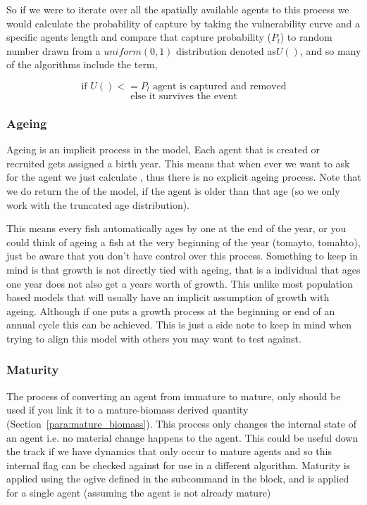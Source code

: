 So if we were to iterate over all the spatially available agents to this process we would calculate the probability of capture by taking the vulnerability curve and a specific agents length and compare that capture probability ($P_l$) to random number drawn from a $uniform(0,1)$ distribution denoted as$U()$, and so many of the algorithms include the term,

$$ \text{if }U() <= P_l \text{ agent is captured and removed}$$
$$ \text{else it survives the event}$$

\subsubsection{Ageing}

Ageing is an implicit process in the model, Each agent that is created or recruited gets assigned a birth year. This means that when ever we want to ask for the agent we just calculate , thus there is no explicit ageing process. Note that we do return the  of the model, if the agent is older than that age (so we only work with the truncated age distribution).


This means every fish automatically ages by one at the end of the year, or you could think of ageing a fish at the very beginning of the year (tomayto, tomahto), just be aware that you don't have control over this process. Something to keep in mind is that growth is not directly tied with ageing, that is a individual that ages one year does not also get a years worth of growth. This unlike most population based models that will usually have an implicit assumption of growth with ageing. Although if one puts a growth process at the beginning or end of an annual cycle this can be achieved. This is just a side note to keep in mind when trying to align this model with others you may want to test against.


\subsubsection{Maturity}\label{subsubsec:maturity}
The process of converting an agent from immature to mature, only should be used if you link it to a mature-biomass derived quantity (Section~\ref{para:mature_biomass}). This process only changes the internal state of an agent i.e. no material change happens to the agent. This could be useful down the track if we have dynamics that only occur to mature agents and so this internal flag can be checked against for use in a different algorithm. Maturity is applied using the ogive defined in the subcommand  in the  block, and is applied for a single agent (assuming the agent is not already mature)

